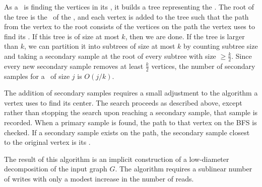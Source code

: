 As a \clustcenter\ is finding the vertices in its \cluster, it builds a tree representing the \cluster. The root of the tree is the \clustcenter\ of the \cluster, and each vertex is added to the tree such that the path from the vertex to the root consists of the vertices on the path the vertex uses to find its \clustcenter. If this tree is of size at most $k$, then we are done. If the tree is larger than $k$, we can partition it into subtrees of size at most $k$ by counting subtree size and taking a secondary sample at the root of every subtree with size $\geq \frac{k}{2}$. Since every new secondary sample removes at least $\frac{k}{2}$ vertices, the number of secondary samples for a \cluster\ of size $j$ is $O(j/k)$. 

The addition of secondary samples requires a small adjustment to the algorithm a vertex uses to find its center. The search proceeds as described above, except rather than stopping the search upon reaching a secondary sample, that sample is recorded. When a primary sample is found, the path to that vertex on the BFS is checked. If a secondary sample exists on the path, the secondary sample closest to the original vertex is its \clustcenter. 

The result of this algorithm is an implicit construction of a low-diameter decomposition of the input graph $G$. The algorithm requires a sublinear number of writes with only a modest increase in the number of reads. 

